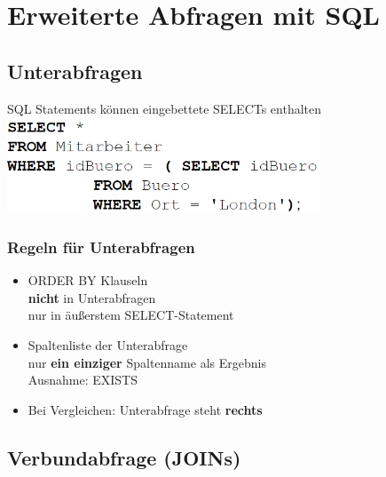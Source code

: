 \documentclass{scrreprt}
\begin{document}
\chapter{Erweiterte Abfragen mit SQL}
\section{Unterabfragen}
SQL Statements können eingebettete SELECTs enthalten
\\\includegraphics[width=0.7\textwidth]{"graphics/Unterabfrage1"}
\subsection{Regeln für Unterabfragen}
\begin{itemize}
  \item ORDER BY Klauseln
  \\\textbf{nicht} in Unterabfragen
  \\nur in äußerstem SELECT-Statement
  \item Spaltenliste der Unterabfrage
  \\nur \textbf{ein einziger} Spaltenname als Ergebnis
  \\Ausnahme: EXISTS
  \item Bei Vergleichen: Unterabfrage steht \textbf{rechts}
\end{itemize}
\section{Verbundabfrage (JOINs)}
\end{document}
